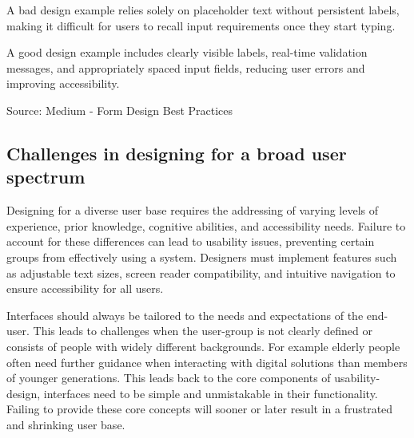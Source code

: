 A bad design example relies solely on placeholder text without persistent labels, making it difficult for users to recall input requirements once they start typing.

A good design example includes clearly visible labels, real-time validation messages, and appropriately spaced input fields, reducing user errors and improving accessibility.

Source: Medium - Form Design Best Practices

\subsection{Challenges in designing for a broad user spectrum}

Designing for a diverse user base requires the addressing of varying levels of experience, prior knowledge, cognitive abilities, and accessibility needs. Failure to account for these differences can lead to usability issues, preventing certain groups from effectively using a system. Designers must implement features such as adjustable text sizes, screen reader compatibility, and intuitive navigation to ensure accessibility for all users.

\blankLine

Interfaces should always be tailored to the needs and expectations of the end-user. This leads to challenges when the user-group is not clearly defined or consists of people with widely different backgrounds. For example elderly people often need further guidance when interacting with digital solutions than members of younger generations. This leads back to the core components of usability-design, interfaces need to be simple and unmistakable in their functionality. Failing to provide these core concepts will sooner or later result in a frustrated and shrinking user base. 
\autocite{Paul:UIUXIntroduction}

\blankLine



\newpage